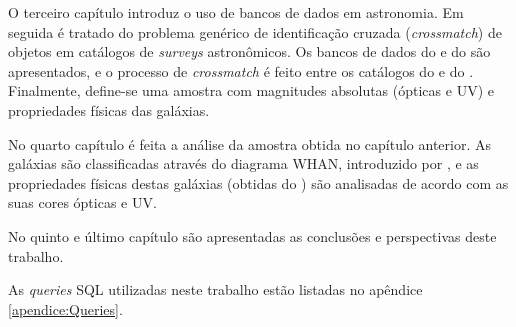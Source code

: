 O terceiro capítulo introduz o uso de bancos de dados em astronomia. Em seguida
é tratado do problema genérico de identificação cruzada ({\em crossmatch}) de
objetos em catálogos de {\em surveys} astronômicos. Os bancos de dados do \SDSS
e do \starlight são apresentados, e o processo de {\em crossmatch} é feito entre
os catálogos do \SDSS e do \galex. Finalmente, define-se uma amostra com
magnitudes absolutas (ópticas e UV) e propriedades físicas das galáxias.

No quarto capítulo é feita a análise da amostra obtida no capítulo anterior. As
galáxias são classificadas através do diagrama WHAN, introduzido por
\citet{CidFernandes2010, CidFernandes2011}, e as propriedades físicas destas
galáxias (obtidas do \starlight) são analisadas de acordo com as suas cores
ópticas e UV.

No quinto e último capítulo são apresentadas as conclusões e perspectivas deste
trabalho.

As {\em queries} SQL utilizadas neste trabalho estão listadas no apêndice
\ref{apendice:Queries}.

